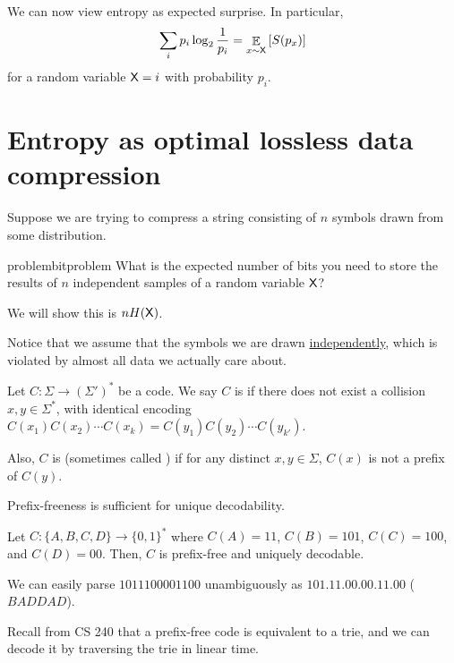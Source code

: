 \documentclass[class=co432,notes,tikz]{agony}
\DeclareMathOperator*{\E}{\mathbb{E}}
\begin{document}
We can now view entropy as expected surprise. In particular,
\[ \sum_i p_i \log_2\frac{1}{p_i} = \E_{x \sim \rv X}\qty[S(p_x)] \]
for a random variable $\mathsf X = i$ with probability $p_i$.

\section{Entropy as optimal lossless data compression}

Suppose we are trying to compress a string consisting of $n$
symbols drawn from some distribution.

\begin{restatable}{problem}{bitproblem}
  What is the expected number of bits you need to store the results of $n$ independent samples
  of a random variable $\mathsf X$?
\end{restatable}

We will show this is $nH(\mathsf X)$.

Notice that we assume that the symbols we are drawn \uline{independently},
which is violated by almost all data we actually care about.

\begin{defn}
  Let $C : \Sigma \to (\Sigma')^*$ be a code.
  We say $C$ is  if there does not exist
  a collision $x, y \in \Sigma^*$,
  with identical encoding $C(x_1)C(x_2)\cdots C(x_k) = C(y_1)C(y_2)\cdots C(y_{k'})$.

  Also, $C$ is  (sometimes called )
  if for any distinct $x,y \in \Sigma$, $C(x)$ is not a prefix of $C(y)$.
\end{defn}

\begin{prop}
  Prefix-freeness is sufficient for unique decodability.
\end{prop}

\begin{example}
  Let $C : \{A,B,C,D\} \to \{0,1\}^*$ where
  $C(A) = 11$, $C(B) = 101$, $C(C) = 100$, and $C(D) = 00$.
  Then, $C$ is prefix-free and uniquely decodable.

  We can easily parse $1011100001100$ unambiguously as $101.11.00.00.11.00$
  ($BADDAD$).
\end{example}

Recall from CS 240 that a prefix-free code is equivalent to a trie,
and we can decode it by traversing the trie in linear time.
\end{document}
